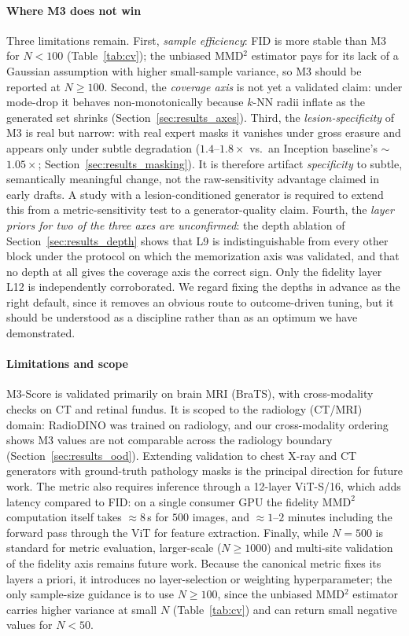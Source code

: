 \documentclass[lettersize,journal]{IEEEtran}
\begin{document}
\paragraph{Where M3 does not win}
Three limitations remain. First, \emph{sample efficiency}: FID
is more stable than M3 for $N < 100$ (Table~\ref{tab:cv}); the unbiased
MMD$^2$ estimator pays for its lack of a Gaussian assumption with higher
small-sample variance, so M3 should be reported at $N \geq 100$. Second, the
\emph{coverage axis} is not yet a validated claim: under mode-drop it
behaves non-monotonically because $k$-NN radii inflate as the generated set
shrinks (Section~\ref{sec:results_axes}). Third, the \emph{lesion-specificity}
of M3 is real but narrow: with real expert masks it vanishes under gross
erasure and appears only under subtle degradation ($1.4$--$1.8\times$ vs.\ an
Inception baseline's $\sim$$1.05\times$; Section~\ref{sec:results_masking}). It
is therefore artifact \emph{specificity} to subtle, semantically meaningful
change, not the raw-sensitivity advantage claimed in early drafts. A study with
a lesion-conditioned generator is required to extend this from a
metric-sensitivity test to a generator-quality claim.
Fourth, the \emph{layer priors for two of the three axes are unconfirmed}: the
depth ablation of Section~\ref{sec:results_depth} shows that L9 is
indistinguishable from every other block under the protocol on which the
memorization axis was validated, and that no depth at all gives the coverage
axis the correct sign. Only the fidelity layer L12 is independently
corroborated. We regard fixing the depths in advance as the right default,
since it removes an obvious route to outcome-driven tuning, but it should be
understood as a discipline rather than as an optimum we have demonstrated.

\paragraph{Limitations and scope}
M3-Score is validated primarily on brain MRI (BraTS), with cross-modality
checks on CT and retinal fundus. It is scoped to the radiology (CT/MRI)
domain: RadioDINO was trained on radiology, and our cross-modality ordering
shows M3 values are not comparable across the radiology boundary
(Section~\ref{sec:results_ood}). Extending validation to chest X-ray and CT
generators with ground-truth pathology masks is the principal direction for
future work.
The metric also requires inference through a 12-layer ViT-S/16, which
adds latency compared to FID: on a single consumer GPU the fidelity
$\mathrm{MMD}^2$ computation itself takes $\approx 8$\,s for $500$ images,
and $\approx 1$--$2$ minutes including the forward pass through the ViT for
feature extraction.
Finally, while $N = 500$ is standard for metric evaluation, larger-scale
($N \geq 1000$) and multi-site validation of the fidelity axis remains future
work.
Because the canonical metric fixes its layers a priori, it introduces no
layer-selection or weighting hyperparameter; the only sample-size guidance
is to use $N \geq 100$, since the unbiased MMD$^2$ estimator carries higher
variance at small $N$ (Table~\ref{tab:cv}) and can return small negative
values for $N < 50$.
\end{document}
